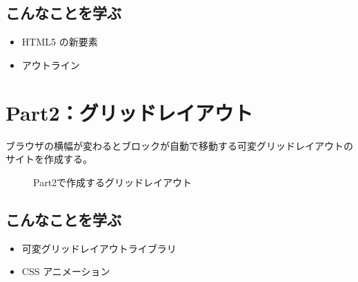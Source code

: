 \subsection*{こんなことを学ぶ}
\begin{itemize}\setlength{\leftskip}{-1.00zw}%
\item HTML5 の新要素
\item アウトライン
\end{itemize}
\section{Part2：グリッドレイアウト}
ブラウザの横幅が変わるとブロックが自動で移動する可変グリッドレイアウトのサイトを作成する。
\vspc{-5.00pt}\begin{figure}[H]\centering{}\caption{Part2で作成するグリッドレイアウト}\label{Part2で作成するグリッドレイアウト}\end{figure}
\subsection*{こんなことを学ぶ}
\begin{itemize}\setlength{\leftskip}{-1.00zw}%
\item 可変グリッドレイアウトライブラリ
\item CSS アニメーション
\end{itemize}
